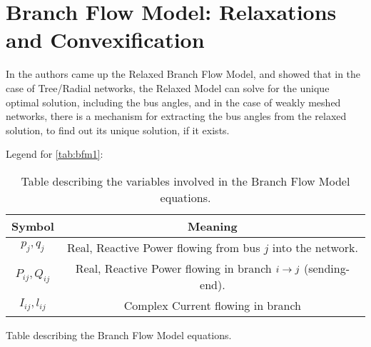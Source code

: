 \chapter{Branch Flow Model: Relaxations and Convexification}

In \cite{bfm01} the authors came up the Relaxed Branch Flow Model, and showed that in the case of Tree/Radial networks, the Relaxed Model can solve for the unique optimal solution, including the bus angles, and in the case of weakly meshed networks, there is a mechanism for extracting the bus angles from the relaxed solution, to find out its unique solution, if it exists.

\newcommand{\fromto}[1]{%
	\StrBefore{#1}{,}[\from]%
	\StrBehind{#1}{,}[\to]%
	\from \rightarrow \to%
}

Legend for \cref{tab:bfm1}:
\begin{table}[h]
	\caption{Table describing the variables involved in the Branch Flow Model equations.}
	\label{leg:bfm1}
	\begin{tabular}{cc}
		\toprule
		Symbol & Meaning \\
		\midrule
		$p_j, q_j$ & Real, Reactive Power flowing from bus $j$ into the network. \\
		$P_{ij}, Q_{ij}$ & Real, Reactive Power flowing in branch $\fromto{i, j}$ (sending-end). \\
		$I_{ij}, l_{ij}$ & Complex Current flowing in branch \\
		\bottomrule
	\end{tabular}
\end{table}

\begin{table}[h]
	\caption{Table describing the Branch Flow Model equations.}
	\label{tab:bfm1}
	\centering
	\hspace*{-2cm}
	
\end{table}

